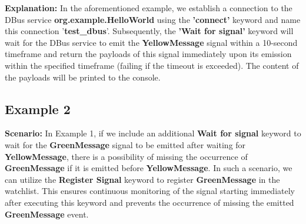 \textbf{Explanation:}
In the aforementioned example, we establish a connection to the DBus service \textbf{org.example.HelloWorld} using the \textbf{'connect'} keyword and name this connection '\textbf{test\_dbus}'. 
Subsequently, the \textbf{'Wait for signal'} keyword will wait for the DBus service to emit the \textbf{YellowMessage} signal within a 10-second timeframe and return the payloads of this signal 
immediately upon its emission within the specified timeframe (failing if the timeout is exceeded). The content of the payloads will be printed to the console.

\hypertarget{description-example2}{%
\subsection{\texorpdfstring{\textbf{Example 2}}{Example 2}}\label{description-example2}}

\textbf{Scenario:}
In Example 1, if we include an additional \textbf{Wait for signal} keyword to wait for the \textbf{GreenMessage} signal to be emitted after waiting for \textbf{YellowMessage}, 
there is a possibility of missing the occurrence of \textbf{GreenMessage} if it is emitted before \textbf{YellowMessage}. In such a scenario, we can utilize the \textbf{Register Signal} 
keyword to register \textbf{GreenMessage} in the watchlist. This ensures continuous monitoring of the signal starting immediately after executing this keyword and prevents the occurrence 
of missing the emitted \textbf{GreenMessage} event.



